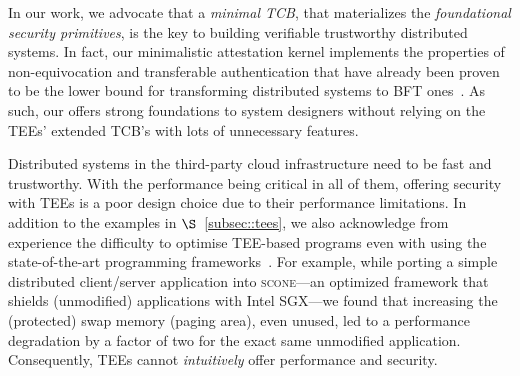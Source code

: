  In our work, we advocate that a {\em minimal TCB}, that materializes the {\em foundational security primitives}, is the key to building verifiable trustworthy distributed systems. In fact, our minimalistic attestation kernel implements the properties of non-equivocation and transferable authentication that have already been proven to be the lower bound for transforming distributed systems to BFT ones~\cite{clement2012}. As such, our \projecttitle{} offers strong foundations to system designers without relying on the TEEs' extended TCB's with lots of unnecessary features.


 Distributed systems in the third-party cloud infrastructure need to be fast and trustworthy. With the performance being critical in all of them, offering security with TEEs is a poor design choice due to their performance limitations. In addition to the examples in $\S$~\ref{subsec::tees}, we also acknowledge from experience the difficulty to optimise TEE-based programs even with using the state-of-the-art programming frameworks~\cite{scone}. For example, while porting a simple distributed client/server application into \textsc{scone}---an optimized framework that shields (unmodified) applications with Intel SGX---we found that increasing the (protected) swap memory (paging area), even unused, led to a performance degradation by a factor of two for the exact same unmodified application. Consequently, TEEs cannot {\em intuitively} offer performance and security.


